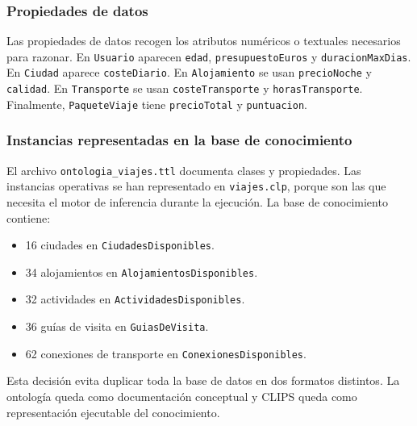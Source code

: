 \documentclass[11pt,a4paper]{article}
\begin{document}
\subsubsection{Propiedades de datos}
Las propiedades de datos recogen los atributos num\'ericos o textuales
necesarios para razonar. En \texttt{Usuario} aparecen \texttt{edad},
\texttt{presupuestoEuros} y \texttt{duracionMaxDias}. En \texttt{Ciudad}
aparece \texttt{costeDiario}. En \texttt{Alojamiento} se usan
\texttt{precioNoche} y \texttt{calidad}. En \texttt{Transporte} se usan
\texttt{costeTransporte} y \texttt{horasTransporte}. Finalmente,
\texttt{PaqueteViaje} tiene \texttt{precioTotal} y \texttt{puntuacion}.

\subsubsection{Instancias representadas en la base de conocimiento}
El archivo \texttt{ontologia\_viajes.ttl} documenta clases y propiedades. Las
instancias operativas se han representado en \texttt{viajes.clp}, porque son
las que necesita el motor de inferencia durante la ejecuci\'on. La base de
conocimiento contiene:
\begin{itemize}
    \item 16 ciudades en \texttt{CiudadesDisponibles}.
    \item 34 alojamientos en \texttt{AlojamientosDisponibles}.
    \item 32 actividades en \texttt{ActividadesDisponibles}.
    \item 36 gu\'ias de visita en \texttt{GuiasDeVisita}.
    \item 62 conexiones de transporte en \texttt{ConexionesDisponibles}.
\end{itemize}

Esta decisi\'on evita duplicar toda la base de datos en dos formatos distintos.
La ontolog\'ia queda como documentaci\'on conceptual y CLIPS queda como
representaci\'on ejecutable del conocimiento.
\end{document}
